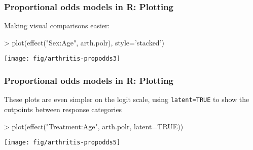 \begin{frame}[fragile]
   \frametitle{Proportional odds models in R: Plotting}
Making visual comparisons easier:
\begin{Rin}[baselinestretch=0.8]
> plot(effect("Sex:Age", arth.polr), style='stacked')
\end{Rin}
\begin{center}
 \texttt{[image: fig/arthritis-propodds3]}
\end{center}

\end{frame}

\begin{frame}[fragile]
   \frametitle{Proportional odds models in R: Plotting}
These plots are even simpler on the logit scale, using \texttt{latent=TRUE} to show the
cutpoints between response categories
\begin{Rin}
> plot(effect("Treatment:Age", arth.polr, latent=TRUE))
\end{Rin}
\begin{center}
 \texttt{[image: fig/arthritis-propodds5]}
\end{center}

\end{frame}



\endinput

\begin{frame}
  \frametitle{}
  \begin{itemize}
	\item{\large\bfseries }
      \begin{itemize*}
	  \item 
    	\begin{itemize*}
		\item 
		\item 
		\end{itemize*}
	  \item 
	  \end{itemize*}
	\item{\large\bfseries }
	\item{\large\bfseries }
  \end{itemize}
\end{frame}

